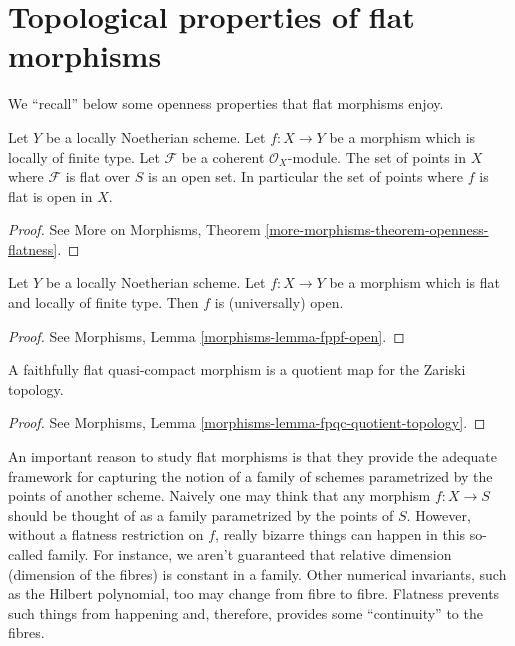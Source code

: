 \section{Topological properties of flat morphisms}
\label{section-topological-flat}

\noindent
We ``recall'' below some openness properties that flat morphisms enjoy.

\begin{theorem}
\label{theorem-flat-open}
Let $Y$ be a locally Noetherian scheme.
Let $f : X \to Y$ be a morphism which is locally of finite type.
Let $\mathcal{F}$ be a coherent $\mathcal{O}_X$-module.
The set of points in $X$ where $\mathcal{F}$ is flat over $S$ is an open set.
In particular the set of points where $f$ is flat is open in $X$.
\end{theorem}

\begin{proof}
See More on Morphisms, Theorem \ref{more-morphisms-theorem-openness-flatness}.
\end{proof}

\begin{theorem}
\label{theorem-flat-map-open}
Let $Y$ be a locally Noetherian scheme.
Let $f : X \to Y$ be a morphism which is flat and locally of finite type.
Then $f$ is (universally) open.
\end{theorem}

\begin{proof}
See Morphisms, Lemma \ref{morphisms-lemma-fppf-open}.
\end{proof}

\begin{theorem}
\label{theorem-flat-is-quotient}
A faithfully flat quasi-compact morphism is a quotient map for
the Zariski topology.
\end{theorem}

\begin{proof}
See Morphisms, Lemma \ref{morphisms-lemma-fpqc-quotient-topology}.
\end{proof}

\noindent
An important reason to study flat morphisms is that they provide the adequate
framework for capturing the notion of a family of schemes parametrized by the
points of another scheme. Naively one may think that any morphism $f : X \to S$
should be thought of as a family parametrized by the points of $S$. However,
without a flatness restriction on $f$, really bizarre things can happen in
this so-called family. For instance, we aren't guaranteed that relative
dimension (dimension of the fibres) is constant in a family. Other numerical
invariants, such as the Hilbert polynomial, too may change from fibre to
fibre. Flatness prevents such things from happening and, therefore, provides
some ``continuity'' to the fibres.


